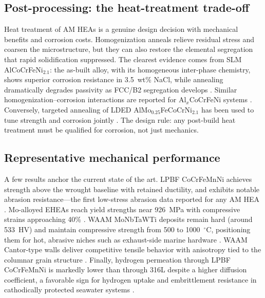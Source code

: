 \subsection{Post-processing: the heat-treatment trade-off}

Heat treatment of AM HEAs is a genuine design decision with mechanical benefits and corrosion costs. Homogenization anneals relieve residual stress and coarsen the microstructure, but they can also restore the elemental segregation that rapid solidification suppressed. The clearest evidence comes from SLM AlCoCrFeNi$_{2.1}$: the as-built alloy, with its homogeneous inter-phase chemistry, shows superior corrosion resistance in 3.5~wt\% NaCl, while annealing dramatically degrades passivity as FCC/B2 segregation develops \cite{slm_ehea_2025}. Similar homogenization--corrosion interactions are reported for Al$_x$CoCrFeNi systems \cite{han2025}. Conversely, targeted annealing of LDED AlMo$_{0.25}$FeCoCrNi$_{2.1}$ has been used to tune strength and corrosion jointly \cite{lded_almofeco2024}. The design rule: any post-build heat treatment must be qualified for corrosion, not just mechanics.

\subsection{Representative mechanical performance}

A few results anchor the current state of the art. LPBF CoCrFeMnNi achieves strength above the wrought baseline with retained ductility, and exhibits notable abrasion resistance---the first low-stress abrasion data reported for any AM HEA \cite{lpbf_cantor_2024}. Mo-alloyed EHEAs reach yield strengths near 926~MPa with compressive strains approaching 40\% \cite{mo_ehea_2026}. WAAM MoNbTaWTi deposits remain hard (around 533~HV) and maintain compressive strength from 500 to 1000~$^{\circ}$C, positioning them for hot, abrasive niches such as exhaust-side marine hardware \cite{liu2021waam}. WAAM Cantor-type walls deliver competitive tensile behavior with anisotropy tied to the columnar grain structure \cite{andersson2026waam}. Finally, hydrogen permeation through LPBF CoCrFeMnNi is markedly lower than through 316L despite a higher diffusion coefficient, a favorable sign for hydrogen uptake and embrittlement resistance in cathodically protected seawater systems \cite{lpbf_cantor_2024}.
